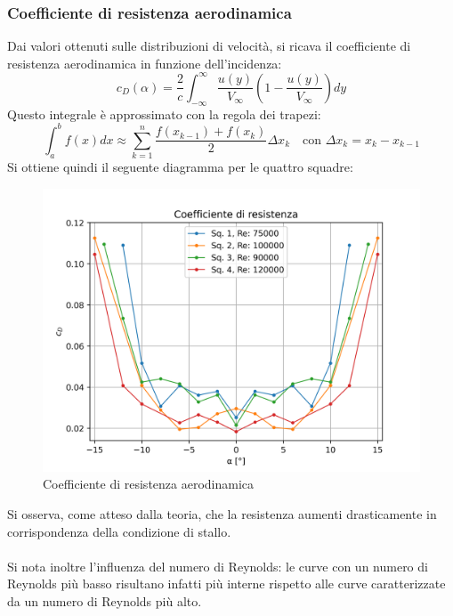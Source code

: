 \subsubsection{Coefficiente di resistenza aerodinamica}
Dai valori ottenuti sulle distribuzioni di velocità, si ricava il coefficiente di resistenza aerodinamica in funzione dell'incidenza:
\begin{equation*}
    c_D(\alpha) = \frac 2c \int_{-\infty}^\infty \frac{u(y)}{V_\infty}\left(1-\frac{u(y)}{V_\infty}\right)dy
\end{equation*}
Questo integrale è approssimato con la regola dei trapezi:
\begin{equation*}
    \int_a^b f(x)dx \approx \sum_{k=1}^n \frac{f(x_{k-1}) + f(x_k)}2 \Delta x_k \quad \text{con } \Delta x_k = x_k - x_{k-1}
\end{equation*}
Si ottiene quindi il seguente diagramma per le quattro squadre:
\begin{figure}[H]
    \centering
    \includegraphics[width=.8\textwidth]{images/6/cd.png}
    \caption{Coefficiente di resistenza aerodinamica}
\end{figure}

\noindent Si osserva, come atteso dalla teoria, che la resistenza aumenti drasticamente in corrispondenza della condizione di stallo.\\\\
Si nota inoltre l'influenza del numero di Reynolds: le curve con un numero di Reynolds più basso risultano infatti più interne rispetto alle curve caratterizzate da un numero di Reynolds più alto.
\newpage
